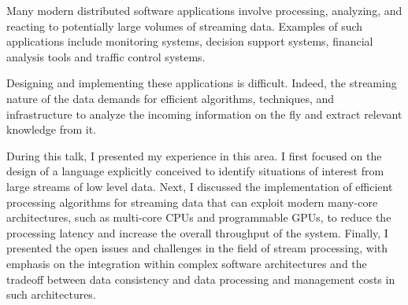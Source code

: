 Many modern distributed software applications involve processing, analyzing, and reacting to potentially large volumes of streaming data. Examples of such applications include monitoring systems, decision support systems, financial analysis tools and traffic control systems.

Designing and implementing these applications is difficult. Indeed, the streaming nature of the data demands for efficient algorithms, techniques, and infrastructure to analyze the incoming information on the fly and extract relevant knowledge from it.

During this talk, I presented my experience in this area. I first focused on the design of a language explicitly conceived to identify situations of interest from large streams of low level data. Next, I discussed the implementation of efficient processing algorithms for streaming data that can exploit modern many-core architectures, such as multi-core CPUs and programmable GPUs, to reduce the processing latency and increase the overall throughput of the system. Finally, I presented the open issues and challenges in the field of stream processing, with emphasis on the integration within complex software architectures and the tradeoff between data consistency and data processing and management costs in such architectures.
